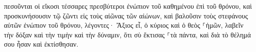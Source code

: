 \documentclass{openreader}
\begin{document}
πεσοῦνται οἱ εἴκοσι τέσσαρες πρεσβύτεροι ἐνώπιον τοῦ καθημένου ἐπὶ τοῦ θρόνου, καὶ προσκυνήσουσιν τῷ ζῶντι εἰς τοὺς αἰῶνας τῶν αἰώνων, καὶ βαλοῦσιν τοὺς στεφάνους αὐτῶν ἐνώπιον τοῦ θρόνου, λέγοντες· 
Ἄξιος εἶ, ὁ κύριος καὶ ὁ θεὸς ⸀ἡμῶν, λαβεῖν τὴν δόξαν καὶ τὴν τιμὴν καὶ τὴν δύναμιν, ὅτι σὺ ἔκτισας ⸀τὰ πάντα, καὶ διὰ τὸ θέλημά σου ἦσαν καὶ ἐκτίσθησαν. 
\end{document}
